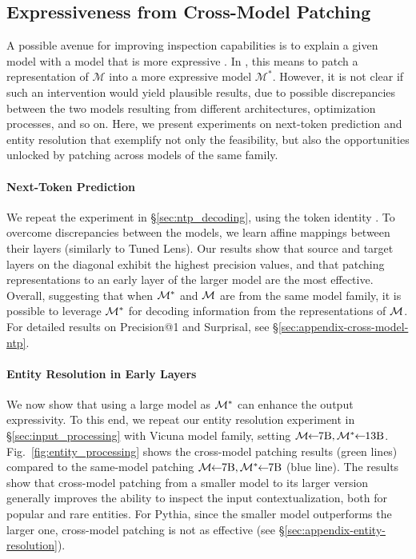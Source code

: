 \documentclass{article}
\theoremstyle{plain}
\theoremstyle{definition}
\theoremstyle{remark}
\begin{document}
\subsection{Expressiveness from Cross-Model Patching}
\label{sec:cross_model}

A possible avenue for improving inspection capabilities is to explain a given model with a model that is more expressive \cite{bills2023language}. In \methodFamilyName{}, this means to patch a representation of $\mathcal{M}$ into a more expressive model $\mathcal{M}^*$. However, it is not clear if such an intervention would yield plausible results, due to possible discrepancies between the two models resulting from different architectures, optimization processes, and so on. Here, we present experiments on next-token prediction and entity resolution that exemplify not only the feasibility, but also the opportunities unlocked by patching across models of the same family.


\paragraph{Next-Token Prediction} We repeat the experiment in \S\ref{sec:ntp_decoding}, using the token identity \methodName{}. To overcome discrepancies between the models, we learn affine mappings between their layers (similarly to Tuned Lens).
Our results show that source and target layers on the diagonal exhibit the highest precision values, and that patching representations to an early layer of the larger model are the most effective. Overall, suggesting that when $\mathcal{M}^*$ and $\mathcal{M}$ are from the same model family, it is possible to leverage $\mathcal{M}^*$ for decoding information from the representations of $\mathcal{M}$. 
For detailed results on Precision@1 and Surprisal, see \S\ref{sec:appendix-cross-model-ntp}.

\paragraph{Entity Resolution in Early Layers} 
We now show that using a large model as $\mathcal{M}^*$ can enhance the output expressivity. To this end, we repeat our entity resolution experiment in \S\ref{sec:input_processing} with Vicuna model family, setting $\sourceModel\!\!\is\!\!\text{7B}, \targetModel\!\!\is\!\!\text{13B}$. Fig.~\ref{fig:entity_processing} shows the cross-model patching results (green lines) compared to the same-model patching $\sourceModel\!\!\is\!\!\text{7B}, \targetModel\!\!\is\!\!\text{7B}$ (blue line). 
The results show that cross-model patching from a smaller model to its larger version generally improves the ability to inspect the input contextualization, both for popular and rare entities. For Pythia, since the smaller model outperforms the larger one, cross-model patching is not as effective (see \S\ref{sec:appendix-entity-resolution}). 
\end{document}
